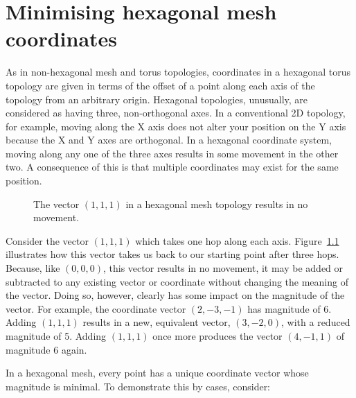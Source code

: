 \chapter{Minimising hexagonal mesh coordinates}
	\label{app:minimal-hex-coordinates}
	
	As in non-hexagonal mesh and torus topologies, coordinates in a hexagonal
	torus topology are given in terms of the offset of a point along each axis of
	the topology from an arbitrary origin. Hexagonal topologies, unusually, are
	considered as having three, non-orthogonal axes. In a conventional 2D
	topology, for example, moving along the X axis does not alter your position
	on the Y axis because the X and Y axes are orthogonal. In a hexagonal
	coordinate system, moving along any one of the three axes results in some
	movement in the other two.  A consequence of this is that multiple
	coordinates may exist for the same position.
	
	\begin{figure}
		\center
		\caption[$(1,1,1)$ in a hexagonal mesh or torus.]%
		{The vector $(1, 1, 1)$ in a hexagonal mesh topology results in
		no movement.}
		\label{fig:hex-mesh-loop}
	\end{figure}
	
	Consider the vector $(1,1,1)$ which takes one hop along each axis.
	Figure~\ref{fig:hex-mesh-loop} illustrates how this vector takes us back to
	our starting point after three hops. Because, like $(0,0,0)$, this vector
	results in no movement, it may be added or subtracted to any existing vector
	or coordinate without changing the meaning of the vector. Doing so, however,
	clearly has some impact on the magnitude of the vector. For example, the
	coordinate vector $(2, -3, -1)$ has magnitude of 6. Adding $(1,1,1)$ results
	in a new, equivalent vector, $(3, -2, 0)$, with a reduced magnitude of 5.
	Adding $(1,1,1)$ once more produces the vector $(4, -1, 1)$ of magnitude 6
	again.
	
	In a hexagonal mesh, every point has a unique coordinate vector whose
	magnitude is minimal. To demonstrate this by cases, consider:
	
